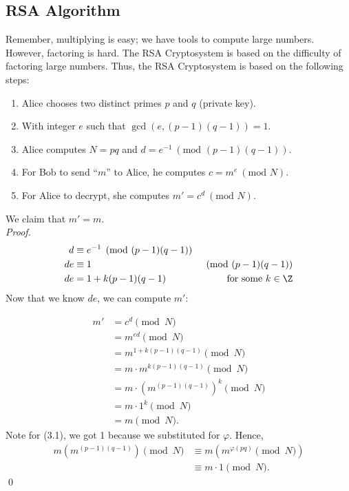 \label{sec:RSA Algorithm}

\subsection{RSA Algorithm}

Remember, multiplying is easy; we have tools to compute large numbers. However, factoring is hard. The RSA Cryptosystem is based on the difficulty of factoring large numbers. Thus, the RSA Cryptosystem is based on the following steps:
\begin{enumerate}
    \item Alice chooses two distinct primes \(p\) and \(q\) (private key).
    \item With integer \(e\) such that \(\gcd(e, (p-1)(q-1)) = 1\).
    \item Alice computes \(N = pq\) and \(d = e^{-1} \ (\text{mod } (p-1)(q-1))\).
    \item For Bob to send ``\(m\)'' to Alice, he computes \(c = m^e \ (\text{mod } N)\).
    \item For Alice to decrypt, she computes \(m' = c^d \ (\text{mod } N)\).
\end{enumerate}
\pfs

We claim that \(m' = m\). \\

\noindent \textit{Proof.} \begin{align*}
    d  & \equiv e^{-1}\pmod{(p-1)(q-1)}                             \\
    de & \equiv 1                       & \pmod{(p-1)(q-1)}         \\
    de & = 1 + k(p-1)(q-1)              & \text{for some } k \in \Z
\end{align*} Now that we know \(de\), we can compute \(m'\):

\begin{align*}
    m' & = c^d \pmod{N}                                  \\
       & = m^{ed} \pmod{N}                               \\
       & = m^{1 + k(p-1)(q-1)} \pmod{N}                  \\
       & = m \cdot m^{k(p-1)(q-1)} \pmod{N}              \\
       & = m \cdot (m^{(p-1)(q-1)})^k \pmod{N} \tag{3.1} \\
       & = m \cdot 1^k \pmod{N}                          \\
       & = m \pmod{N}.
\end{align*} Note for (3.1), we got 1 because we substituted for \(\varphi\). Hence, \begin{align*}
    m (m^{(p-1)(q-1)}) \pmod{N} & \equiv m (m^{\varphi(pq)} \pmod{N}) \\
                                & \equiv m \cdot 1 \pmod{N}.
\end{align*} \qed

